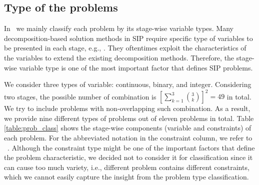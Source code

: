 \subsection{Type of the problems}
In \siplibtwo\, we mainly classify each problem by its stage-wise variable types. Many decomposition-based solution methods in SIP require specific type of variables to be presented in each stage, e.g., \cite{journal:LL1993,journal:SSV1998,journal:CT1998,journal:CS1999,journal:SF2002}. They oftentimes exploit the characteristics of the variables to extend the existing decomposition methods. Therefore, the stage-wise variable type is one of the most important factor that defines SIP problems.

We consider three types of variable: continuous, binary, and integer. Considering two stages, the possible number of combination is $\left[\sum_{k=1}^3\binom{3}{k}\right]^2=49$ in total. We try to include problems with non-overlapping such combination. As a result, we provide nine different types of problems out of eleven problems in total. Table \ref{table:prob_class} shows the stage-wise components (variable and constraints) of each problem. For the abbreviated notation in the constraint column, we refer to \miplib\ \cite{MIPLIB}. Although the constraint type might be one of the important factors that define the problem characteristic, we decided not to consider it for classification since it can cause too much variety, i.e., different problem contains different constraints, which we cannot easily capture the insight from the problem type classification. 
